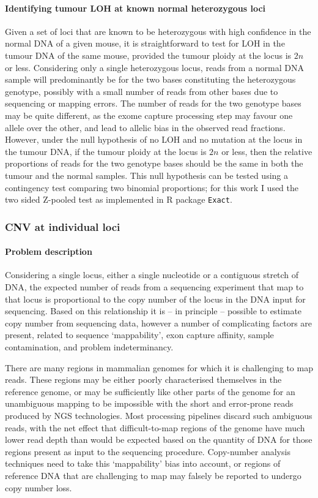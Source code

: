 \documentclass[thesis.tex]{subfiles}
\begin{document}
\paragraph{Identifying tumour \acrshort{LOH} at known normal heterozygous loci}

Given a set of loci that are known to be heterozygous with high confidence in the normal DNA of a given mouse, it is straightforward to test for \gls{LOH} in the tumour DNA of the same mouse, provided the tumour ploidy at the locus is $2n$ or less.  Considering only a single heterozygous locus, reads from a normal DNA sample will predominantly be for the two bases constituting the heterozygous genotype, possibly with a small number of reads from other bases due to sequencing or mapping errors.  The number of reads for the two genotype bases may be quite different, as the exome capture processing step may favour one allele over the other, and lead to allelic bias in the observed read fractions.  However, under the null hypothesis of no LOH and no mutation at the locus in the tumour DNA, if the tumour ploidy at the locus is $2n$ or less, then the relative proportions of reads for the two genotype bases should be the same in both the tumour and the normal samples.  This null hypothesis can be tested using a contingency test comparing two binomial proportions; for this work I used the two sided Z-pooled test as implemented in R package \lstinline|Exact|.


\subsubsection{\Acrlong{CNV} at individual loci}

\paragraph{Problem description}

Considering a single locus, either a single nucleotide or a contiguous stretch of DNA, the expected number of reads from a sequencing experiment that map to that locus is proportional to the copy number of the locus in the DNA input for sequencing.  Based on this relationship it is -- in principle -- possible to estimate copy number from sequencing data, however a number of complicating factors are present, related to sequence `mappability', exon capture affinity, sample contamination, and problem indeterminancy.

There are many regions in mammalian genomes for which it is challenging to map reads.  These regions may be either poorly characterised themselves in the reference genome, or may be sufficiently like other parts of the genome for an unambiguous mapping to be impossible with the short and error-prone reads produced by \gls{NGS} technologies.  Most processing pipelines discard such ambiguous reads, with the net effect that difficult-to-map regions of the genome have much lower read depth than would be expected based on the quantity of DNA for those regions present as input to the sequencing procedure.  Copy-number analysis techniques need to take this `mappability' bias into account, or regions of reference DNA that are challenging to map may falsely be reported to undergo copy number loss.
\end{document}
